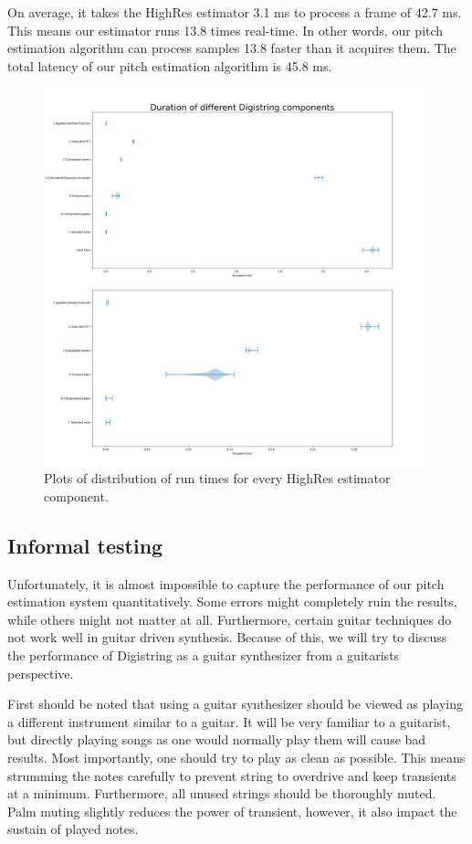 \documentclass[a4paper,10pt,twocolumn]{article}
\begin{document}
On average, it takes the HighRes estimator 3.1 ms to process a frame of 42.7 ms. This means our estimator runs 13.8 times real-time. In other words, our pitch estimation algorithm can process samples 13.8 faster than it acquires them. The total latency of our pitch estimation algorithm is 45.8 ms.
\begin{figure}[h]
    \centering
    \includegraphics[width=\linewidth]{fig/perfplot.png}
    \caption{Plots of distribution of run times for every HighRes estimator component.}
    \label{fig:plotspeed}
\end{figure}


\subsection{Informal testing}
Unfortunately, it is almost impossible to capture the performance of our pitch estimation system quantitatively. Some errors might completely ruin the results, while others might not matter at all. Furthermore, certain guitar techniques do not work well in guitar driven synthesis. Because of this, we will try to discuss the performance of Digistring as a guitar synthesizer from a guitarists perspective.

First should be noted that using a guitar synthesizer should be viewed as playing a different instrument similar to a guitar. It will be very familiar to a guitarist, but directly playing songs as one would normally play them will cause bad results. Most importantly, one should try to play as clean as possible. This means strumming the notes carefully to prevent string to overdrive and keep transients at a minimum. Furthermore, all unused strings should be thoroughly muted. Palm muting slightly reduces the power of transient, however, it also impact the sustain of played notes.
\end{document}
